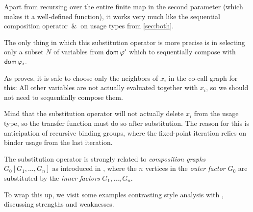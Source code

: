 Apart from recursing over the entire finite map in the second parameter (which makes it a well-defined function), it works very much like the sequential composition operator $\,\&\,$ on usage types from \cref{sec:both}.

The only thing in which this substitution operator is more precise is in selecting only a subset $N$ of variables from $\mathsf{dom}\,\varphi'$ which to sequentially compose with $\mathsf{dom}\,\varphi_i$.

As \textcite{callarity} proves, it is safe to choose only the neighbors of $x_i$ in the co-call graph for this:
All other variables are not actually evaluated together with $x_i$, so we should not need to sequentially compose them.

Mind that the substitution operator will not actually delete $x_i$ from the usage type, so the transfer function must do so after substitution.
The reason for this is anticipation of recursive binding groups, where the fixed-point iteration relies on binder usage from the last iteration.

The substitution operator is strongly related to \emph{composition graphs} $G_0[G_1,\ldots,G_n]$ as introduced in \textcite[pp.~109]{agt}, where the $n$ vertices in the \emph{outer factor} $G_0$ are substituted by the \emph{inner factors} $G_1,\ldots,G_n$. 

To wrap this up, we visit some examples contrasting  style analysis with , discussing strengths and weaknesses.

